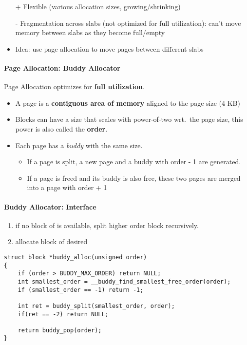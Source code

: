 \begin{itemize}
    \item[+] Flexible (various allocation sizes, growing/shrinking)
    \item[-] Fragmentation across slabs (not optimized for full utilization): can't move memory between slabs as they become full/empty
    \item Idea: use page allocation to move pages between different slabs
\end{itemize}
\paragraph{Page Allocation: Buddy Allocator}
Page Allocation optimizes for \textbf{full utilization}.
\begin{itemize}
    \item A page is a \textbf{contiguous area of memory} aligned to the page size (4 KB)
    \item Blocks can have a size that scales with power-of-two wrt.\ the page size, this power is also called the \textbf{order}.
    \item Each page has a \textit{buddy} with the same size.
          \begin{itemize}
              \item If a page is split, a new page and a buddy with order - 1 are generated.
              \item If a page is freed and its buddy is also free, these two pages are merged into a page with order + 1
          \end{itemize}
\end{itemize}

\paragraph{Buddy Allocator: Interface}
\begin{enumerate}
    \item if no block of  is available, split higher order block recursively.
    \item allocate block of desired 
\end{enumerate}

\begin{lstlisting}[style=bright_C++]
struct block *buddy_alloc(unsigned order)
{
    if (order > BUDDY_MAX_ORDER) return NULL;
    int smallest_order = __buddy_find_smallest_free_order(order);
    if (smallest_order == -1) return -1;

    int ret = buddy_split(smallest_order, order);
    if(ret == -2) return NULL;

    return buddy_pop(order);
}
\end{lstlisting}

